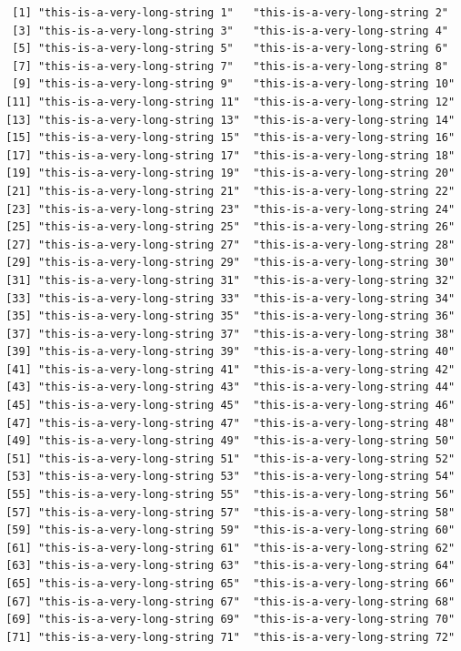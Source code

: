 \documentclass[
  letterpaper,
  DIV=11,
  numbers=noendperiod]{scrartcl}
\begin{document}
\begin{verbatim}
  [1] "this-is-a-very-long-string 1"   "this-is-a-very-long-string 2"  
  [3] "this-is-a-very-long-string 3"   "this-is-a-very-long-string 4"  
  [5] "this-is-a-very-long-string 5"   "this-is-a-very-long-string 6"  
  [7] "this-is-a-very-long-string 7"   "this-is-a-very-long-string 8"  
  [9] "this-is-a-very-long-string 9"   "this-is-a-very-long-string 10" 
 [11] "this-is-a-very-long-string 11"  "this-is-a-very-long-string 12" 
 [13] "this-is-a-very-long-string 13"  "this-is-a-very-long-string 14" 
 [15] "this-is-a-very-long-string 15"  "this-is-a-very-long-string 16" 
 [17] "this-is-a-very-long-string 17"  "this-is-a-very-long-string 18" 
 [19] "this-is-a-very-long-string 19"  "this-is-a-very-long-string 20" 
 [21] "this-is-a-very-long-string 21"  "this-is-a-very-long-string 22" 
 [23] "this-is-a-very-long-string 23"  "this-is-a-very-long-string 24" 
 [25] "this-is-a-very-long-string 25"  "this-is-a-very-long-string 26" 
 [27] "this-is-a-very-long-string 27"  "this-is-a-very-long-string 28" 
 [29] "this-is-a-very-long-string 29"  "this-is-a-very-long-string 30" 
 [31] "this-is-a-very-long-string 31"  "this-is-a-very-long-string 32" 
 [33] "this-is-a-very-long-string 33"  "this-is-a-very-long-string 34" 
 [35] "this-is-a-very-long-string 35"  "this-is-a-very-long-string 36" 
 [37] "this-is-a-very-long-string 37"  "this-is-a-very-long-string 38" 
 [39] "this-is-a-very-long-string 39"  "this-is-a-very-long-string 40" 
 [41] "this-is-a-very-long-string 41"  "this-is-a-very-long-string 42" 
 [43] "this-is-a-very-long-string 43"  "this-is-a-very-long-string 44" 
 [45] "this-is-a-very-long-string 45"  "this-is-a-very-long-string 46" 
 [47] "this-is-a-very-long-string 47"  "this-is-a-very-long-string 48" 
 [49] "this-is-a-very-long-string 49"  "this-is-a-very-long-string 50" 
 [51] "this-is-a-very-long-string 51"  "this-is-a-very-long-string 52" 
 [53] "this-is-a-very-long-string 53"  "this-is-a-very-long-string 54" 
 [55] "this-is-a-very-long-string 55"  "this-is-a-very-long-string 56" 
 [57] "this-is-a-very-long-string 57"  "this-is-a-very-long-string 58" 
 [59] "this-is-a-very-long-string 59"  "this-is-a-very-long-string 60" 
 [61] "this-is-a-very-long-string 61"  "this-is-a-very-long-string 62" 
 [63] "this-is-a-very-long-string 63"  "this-is-a-very-long-string 64" 
 [65] "this-is-a-very-long-string 65"  "this-is-a-very-long-string 66" 
 [67] "this-is-a-very-long-string 67"  "this-is-a-very-long-string 68" 
 [69] "this-is-a-very-long-string 69"  "this-is-a-very-long-string 70" 
 [71] "this-is-a-very-long-string 71"  "this-is-a-very-long-string 72" 

\end{verbatim}
\end{document}
